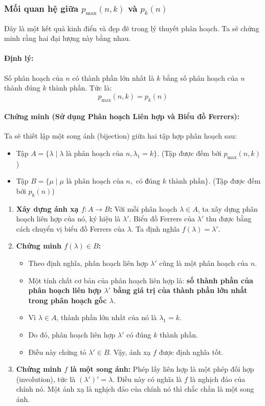 \documentclass[a4paper,12pt]{article}
\begin{document}
\subsubsection{Mối quan hệ giữa $p_{\max}(n, k)$ và $p_k(n)$}
Đây là một kết quả kinh điển và đẹp đẽ trong lý thuyết phân hoạch. Ta sẽ chứng minh rằng hai đại lượng này bằng nhau.

\paragraph{Định lý:} Số phân hoạch của $n$ có thành phần lớn nhất là $k$ bằng số phân hoạch của $n$ thành đúng $k$ thành phần. Tức là:
\[ p_{\max}(n, k) = p_k(n) \]

\paragraph{Chứng minh (Sử dụng Phân hoạch Liên hợp và Biểu đồ Ferrers):}
Ta sẽ thiết lập một song ánh (bijection) giữa hai tập hợp phân hoạch sau:
\begin{itemize}
    \item Tập $A = \{\lambda \mid \lambda \text{ là phân hoạch của } n, \lambda_1 = k \}$. (Tập được đếm bởi $p_{\max}(n, k)$)
    \item Tập $B = \{\mu \mid \mu \text{ là phân hoạch của } n, \text{ có đúng } k \text{ thành phần} \}$. (Tập được đếm bởi $p_k(n)$)
\end{itemize}

\begin{enumerate}
    \item \textbf{Xây dựng ánh xạ $f: A \to B$:}
    Với mỗi phân hoạch $\lambda \in A$, ta xây dựng phân hoạch liên hợp của nó, ký hiệu là $\lambda'$. Biểu đồ Ferrers của $\lambda'$ thu được bằng cách chuyển vị biểu đồ Ferrers của $\lambda$. Ta định nghĩa $f(\lambda) = \lambda'$.

    \item \textbf{Chứng minh $f(\lambda) \in B$:}
    \begin{itemize}
        \item Theo định nghĩa, phân hoạch liên hợp $\lambda'$ cũng là một phân hoạch của $n$.
        \item Một tính chất cơ bản của phân hoạch liên hợp là: \textbf{số thành phần của phân hoạch liên hợp $\lambda'$ bằng giá trị của thành phần lớn nhất trong phân hoạch gốc $\lambda$}.
        \item Vì $\lambda \in A$, thành phần lớn nhất của nó là $\lambda_1 = k$.
        \item Do đó, phân hoạch liên hợp $\lambda'$ có đúng $k$ thành phần.
        \item Điều này chứng tỏ $\lambda' \in B$. Vậy, ánh xạ $f$ được định nghĩa tốt.
    \end{itemize}

    \item \textbf{Chứng minh $f$ là một song ánh:}
    Phép lấy liên hợp là một phép đối hợp (involution), tức là $(\lambda')' = \lambda$. Điều này có nghĩa là $f$ là nghịch đảo của chính nó. Một ánh xạ là nghịch đảo của chính nó thì chắc chắn là một song ánh.
\end{enumerate}
\end{document}
